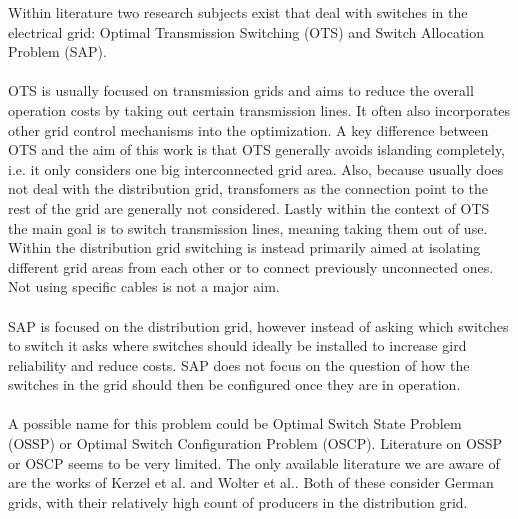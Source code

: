 Within literature two research subjects exist that deal with switches in the
electrical grid: Optimal Transmission Switching (OTS)\autocite{ots_lit_review}
and Switch Allocation Problem (SAP)\autocite{switch_allociation_lit_review}.\\
\\
OTS is usually focused on transmission grids and aims to reduce the overall
operation costs by taking out certain transmission lines. It often also incorporates other grid control
mechanisms into the optimization. A key difference between OTS and the aim of this
work is that OTS generally avoids islanding completely, i.e. it only considers one big interconnected grid 
area. Also, because usually does not deal with the distribution grid, transfomers as the connection point
to the rest of the grid are generally not considered. 
Lastly within the context of OTS the main goal is to switch transmission lines,
meaning taking them out of use. Within the distribution grid switching is instead
primarily aimed at isolating different grid areas from each other or to connect
previously unconnected ones. Not using specific cables is not a major aim.\\
\\
SAP is focused on the distribution grid, however instead of asking which switches to switch
it asks where switches should ideally be installed to increase gird reliability and reduce costs.
SAP does not focus on the question of how the switches in the grid should
then be configured once they are in operation.\\
\\

A possible name for this problem
could be Optimal Switch State Problem (OSSP) or Optimal Switch Configuration Problem (OSCP).
Literature on OSSP or OSCP seems to be very limited. The only available
literature we are aware of are the works of
Kerzel et al.\autocite{optimal_switch_configuration} and
Wolter et al.\autocite{meshed_grids}. Both of these consider German grids, 
with their relatively high count of producers in the distribution grid. 


